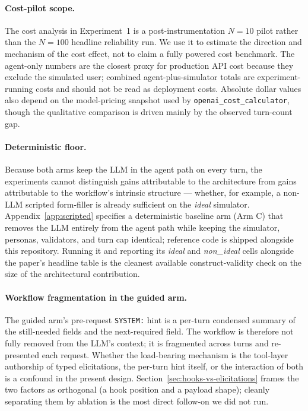 \documentclass[11pt,a4paper]{article}
\newcommand{\rerunPlaceholderN}{100}
\begin{document}
\paragraph{Cost-pilot scope.}
The cost analysis in Experiment~1 is a post-instrumentation $N=10$ pilot rather than the $N=\rerunPlaceholderN$ headline reliability run. We use it to estimate the direction and mechanism of the cost effect, not to claim a fully powered cost benchmark. The agent-only numbers are the closest proxy for production API cost because they exclude the simulated user; combined agent-plus-simulator totals are experiment-running costs and should not be read as deployment costs. Absolute dollar values also depend on the model-pricing snapshot used by \texttt{openai\_cost\_calculator}, though the qualitative comparison is driven mainly by the observed turn-count gap.

\paragraph{Deterministic floor.}
Because both arms keep the LLM in the agent path on every turn, the experiments cannot distinguish gains attributable to the architecture from gains attributable to the workflow's intrinsic structure --- whether, for example, a non-LLM scripted form-filler is already sufficient on the \emph{ideal} simulator. Appendix~\ref{app:scripted} specifies a deterministic baseline arm (Arm C) that removes the LLM entirely from the agent path while keeping the simulator, personas, validators, and turn cap identical; reference code is shipped alongside this repository. Running it and reporting its \emph{ideal} and \emph{non\_ideal} cells alongside the paper's headline table is the cleanest available construct-validity check on the size of the architectural contribution.

\paragraph{Workflow fragmentation in the guided arm.}
The guided arm's pre-request \texttt{SYSTEM:} hint is a per-turn condensed summary of the still-needed fields and the next-required field. The workflow is therefore not fully removed from the LLM's context; it is fragmented across turns and re-presented each request. Whether the load-bearing mechanism is the tool-layer authorship of typed elicitations, the per-turn hint itself, or the interaction of both is a confound in the present design. Section~\ref{sec:hooks-vs-elicitations} frames the two factors as orthogonal (a hook position and a payload shape); cleanly separating them by ablation is the most direct follow-on we did not run.
\end{document}
